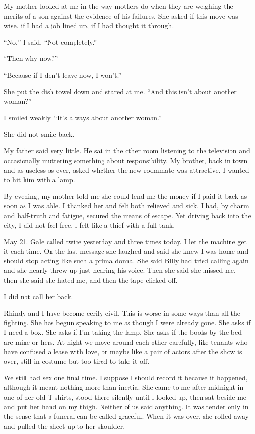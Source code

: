 My mother looked at me in the way mothers do when they are weighing the
merits of a son against the evidence of his failures. She asked if this
move was wise, if I had a job lined up, if I had thought it through.

``No,'' I said. ``Not completely.''

``Then why now?''

``Because if I don't leave now, I won't.''

She put the dish towel down and stared at me. ``And this isn't about
another woman?''

I smiled weakly. ``It's always about another woman.''

She did not smile back.

My father said very little. He sat in the other room listening to the
television and occasionally muttering something about responsibility. My
brother, back in town and as useless as ever, asked whether the new
roommate was attractive. I wanted to hit him with a lamp.

By evening, my mother told me she could lend me the money if I paid it
back as soon as I was able. I thanked her and felt both relieved and
sick. I had, by charm and half-truth and fatigue, secured the means of
escape. Yet driving back into the city, I did not feel free. I felt like
a thief with a full tank.

May 21. Gale called twice yesterday and three times today. I let the
machine get it each time. On the last message she laughed and said she
knew I was home and should stop acting like such a prima donna. She said
Billy had tried calling again and she nearly threw up just hearing his
voice. Then she said she missed me, then she said she hated me, and then
the tape clicked off.

I did not call her back.

Rhindy and I have become eerily civil. This is worse in some ways than
all the fighting. She has begun speaking to me as though I were already
gone. She asks if I need a box. She asks if I'm taking the lamp. She
asks if the books by the bed are mine or hers. At night we move around
each other carefully, like tenants who have confused a lease with love,
or maybe like a pair of actors after the show is over, still in costume
but too tired to take it off.

We still had sex one final time. I suppose I should record it because it
happened, although it meant nothing more than inertia. She came to me
after midnight in one of her old T-shirts, stood there silently until I
looked up, then sat beside me and put her hand on my thigh. Neither of
us said anything. It was tender only in the sense that a funeral can be
called graceful. When it was over, she rolled away and pulled the sheet
up to her shoulder.

